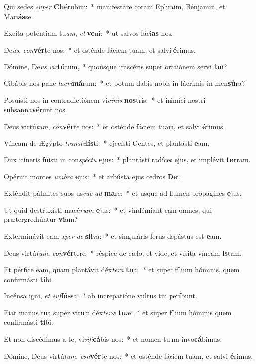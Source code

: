\item Qui sedes \textit{su}\textit{per} \textbf{Ché}rubim:~* manifestáre coram Ephraim, Bénjamin, et Ma\textbf{nás}se.
\item Excita poténtiam tu\textit{am}, \textit{et} \textbf{ve}ni:~* ut salvos fáci\textbf{as} nos.
\item De\textit{us}, \textit{con}\textbf{vér}te nos:~* et osténde fáciem tuam, et salvi \textbf{é}rimus.
\item Dómine, De\textit{us} \textit{vir}\textbf{tú}tum,~* quoúsque irascéris super oratiónem servi \textbf{tu}i?
\item Cibábis nos pane \textit{la}\textit{cri}\textbf{má}rum:~* et potum dabis nobis in lácrimis in men\textbf{sú}ra?
\item Posuísti nos in contradictiónem vi\textit{cí}\textit{nis} \textbf{nos}tris:~* et inimíci nostri subsanna\textbf{vé}runt nos.
\item Deus virtú\textit{tum}, \textit{con}\textbf{vér}te nos:~* et osténde fáciem tuam, et salvi \textbf{é}rimus.
\item Víneam de Ægýpto \textit{trans}\textit{tu}\textbf{lís}ti:~* ejecísti Gentes, et plantásti \textbf{e}am.
\item Dux itíneris fuísti in con\textit{spéc}\textit{tu} \textbf{e}jus:~* plantásti radíces ejus, et implévit \textbf{ter}ram.
\item Opéruit montes \textit{um}\textit{bra} \textbf{e}jus:~* et arbústa ejus cedros \textbf{De}i.
\item Exténdit pálmites suos us\textit{que} \textit{ad} \textbf{ma}re:~* et usque ad flumen propágines \textbf{e}jus.
\item Ut quid destruxísti macé\textit{ri}\textit{am} \textbf{e}jus:~* et vindémiant eam omnes, qui prætergrediúntur \textbf{vi}am?
\item Exterminávit eam a\textit{per} \textit{de} \textbf{sil}va:~* et singuláris ferus depástus est \textbf{e}am.
\item Deus virtú\textit{tum}, \textit{con}\textbf{vér}tere:~* réspice de cælo, et vide, et vísita víneam \textbf{is}tam.
\item Et pérfice eam, quam plantávit déx\textit{te}\textit{ra} \textbf{tu}a:~* et super fílium hóminis, quem confirmásti \textbf{ti}bi.
\item Incénsa igni, \textit{et} \textit{suf}\textbf{fós}sa:~* ab increpatióne vultus tui per\textbf{í}bunt.
\item Fiat manus tua super virum déx\textit{te}\textit{ræ} \textbf{tu}æ:~* et super fílium hóminis quem confirmásti \textbf{ti}bi.
\item Et non discédimus a te, vi\textit{vi}\textit{fi}\textbf{cá}bis nos:~* et nomen tuum invo\textbf{cá}bimus.
\item Dómine, Deus virtú\textit{tum}, \textit{con}\textbf{vér}te nos:~* et osténde fáciem tuam, et salvi \textbf{é}rimus.
